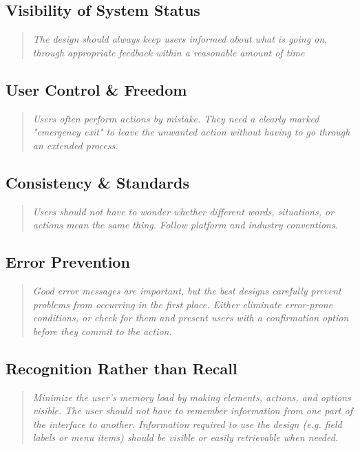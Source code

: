 \documentclass[a4paper,11pt]{report}
\begin{document}
\subsection{Visibility of System Status}
\begin{quote}
    \textit{The design should always keep users informed about what is going on, through appropriate feedback within a reasonable amount of time}
\end{quote}

\subsection{User Control \& Freedom}
\begin{quote}
    \textit{Users often perform actions by mistake. They need a clearly marked "emergency exit" to leave the unwanted action without having to go through an extended process.}
\end{quote}

\subsection{Consistency \& Standards}
\begin{quote}
    \textit{ Users should not have to wonder whether different words, situations, or actions mean the same thing. Follow platform and industry conventions. }
\end{quote}

\subsection{Error Prevention}
\begin{quote}
    \textit{ Good error messages are important, but the best designs carefully prevent problems from occurring in the first place. Either eliminate error-prone conditions, or check for them and present users with a confirmation option before they commit to the action. }
\end{quote}

\subsection{Recognition Rather than Recall}
\begin{quote}
    \textit{ Minimize the user's memory load by making elements, actions, and options visible. The user should not have to remember information from one part of the interface to another. Information required to use the design (e.g. field labels or menu items) should be visible or easily retrievable when needed. }
\end{quote}
\end{document}
